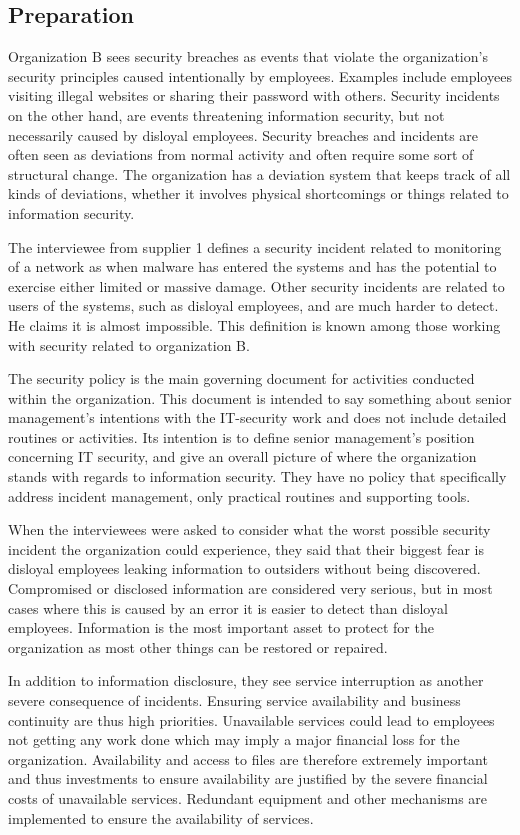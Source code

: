 \subsection{Preparation}
Organization B sees security breaches as events that violate the organization's security principles caused intentionally by employees. Examples include employees visiting illegal websites or sharing their password with others. Security incidents on the other hand, are events threatening information security, but not necessarily caused by disloyal employees. Security breaches and incidents are often seen as deviations from normal activity and often require some sort of structural change. The organization has a deviation system that keeps track of all kinds of deviations, whether it involves physical shortcomings or things related to information security.

The interviewee from supplier 1 defines a security incident related to monitoring of a network as when malware has entered the systems and has the potential to exercise either limited or massive damage. Other security incidents are related to users of the systems, such as disloyal employees, and are much harder to detect. He claims it is almost impossible. This definition is known among those working with security related to organization B. 

The security policy is the main governing document for activities conducted within the organization. This document is intended to say something about senior management's intentions with the IT-security work and does not include detailed routines or activities. Its intention is to define senior management's position concerning IT security, and give an overall picture of where the organization stands with regards to information security. They have no policy that specifically address incident management, only practical routines and supporting tools.

When the interviewees were asked to consider what the worst possible security incident the organization could experience, they said that their biggest fear is disloyal employees leaking information to outsiders without being discovered. Compromised or disclosed information are considered very serious, but in most cases where this is caused by an error it is easier to detect than disloyal employees. Information is the most important asset to protect for the organization as most other things can be restored or repaired.

In addition to information disclosure, they see service interruption as another severe consequence of incidents. Ensuring service availability and business continuity are thus high priorities. Unavailable services could lead to employees not getting any work done which may imply a major financial loss for the organization. Availability and access to files are therefore extremely important and thus investments to ensure availability are justified by the severe financial costs of unavailable services. Redundant equipment and other mechanisms are implemented to ensure the availability of services. 

